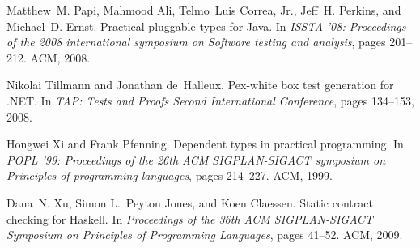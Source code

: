 \documentclass{sig-alternate}
\begin{document}
\begin{thebibliography}{10}
Matthew~M. Papi, Mahmood Ali, Telmo~Luis Correa, Jr., Jeff~H. Perkins, and
  Michael~D. Ernst.
\newblock Practical pluggable types for {Java}.
\newblock In {\em ISSTA '08: Proceedings of the 2008 international symposium on
  Software testing and analysis}, pages 201--212. ACM, 2008.

Nikolai Tillmann and Jonathan de~Halleux.
\newblock Pex-white box test generation for {.NET}.
\newblock In {\em TAP: Tests and Proofs Second International Conference}, pages
  134--153, 2008.

Hongwei Xi and Frank Pfenning.
\newblock Dependent types in practical programming.
\newblock In {\em POPL '99: Proceedings of the 26th ACM SIGPLAN-SIGACT
  symposium on Principles of programming languages}, pages 214--227. ACM, 1999.

Dana~N. Xu, Simon L.~Peyton Jones, and Koen Claessen.
\newblock Static contract checking for {Haskell}.
\newblock In {\em Proceedings of the 36th ACM SIGPLAN-SIGACT Symposium on
  Principles of Programming Languages}, pages 41--52. ACM, 2009.

\end{thebibliography}
\end{document}
